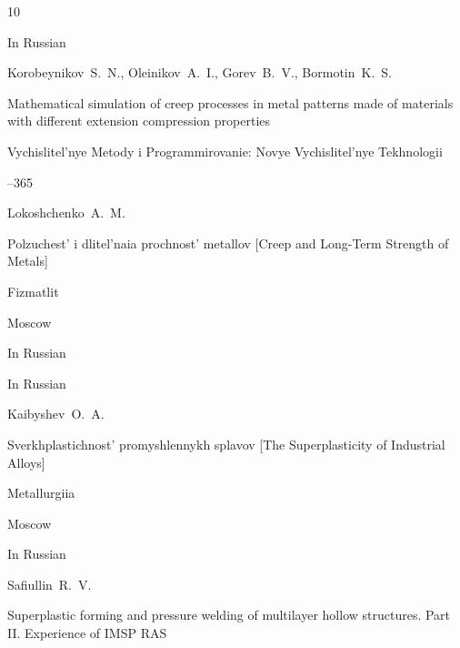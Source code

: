 \begin{thebibliography}{10}

\lang In Russian

\by Korobeynikov~S.~N., Oleinikov~A.~I., Gorev~B.~V.,  Bormotin~K.~S. 

\paper Mathematical simulation of creep processes in metal patterns made of materials with different extension compression properties

\jour Vychislitel'nye Metody i Programmirovanie: Novye Vychislitel'nye Tekhnologii




--365








\by Lokoshchenko~A.~M.

\book Polzuchest' i dlitel'naia prochnost' metallov \rm [Creep and Long-Term Strength of Metals]


\publ Fizmatlit

\publaddr Moscow


\lang In Russian










\lang In Russian

\by Kaibyshev~O.~A.

\book Sverkhplastichnost' promyshlennykh splavov  \rm [The Superplasticity of Industrial Alloys]


\publ Metallurgiia

\publaddr Moscow









\lang In Russian

\by Safiullin~R.~V.

\paper Superplastic forming and pressure welding of multilayer hollow structures. Part II. Experience of IMSP RAS


\end{thebibliography}
